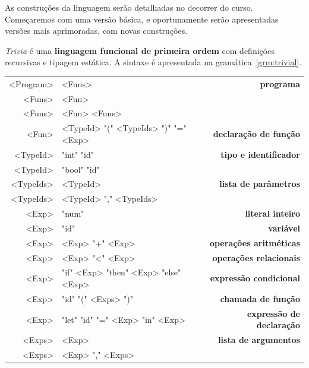 \documentclass[a4paper,11pt,brazil]{article}
\newcommand{\lang}{\textsl{Trivia}}
\begin{document}
As construções da linguagem serão detalhadas no decorrer do
curso. Começaremos com uma versão básica, e oportunamente serão
apresentadas versões mais aprimoradas, com novas construções.

\lang{} é uma \textbf{linguagem funcional de primeira ordem} com
definições recursivas e tipagem estática. A sintaxe é apresentada na
gramática~\ref{grm:trivial}.

\begin{gramatica}
  \begin{synshorts}
    \begin{mdframed}
    \begin{tabular}{r@{$\;\rightarrow\;$}l>{\bfseries}r}
      <Program> & <Funs>                               & programa                \\[.9em]
      <Funs>    & <Fun>                                &                         \\
      <Funs>    & <Fun> <Funs>                         &                         \\[.9em]
      <Fun>     & <TypeId> "(" <TypeIds> ")" "=" <Exp> & declaração de função    \\[.9em]
      <TypeId>  & "int" "id"                           & tipo e identificador    \\
      <TypeId>  & "bool" "id"                          &                         \\[.9em]
      <TypeIds> & <TypeId>                             & lista de parâmetros     \\
      <TypeIds> & <TypeId> "," <TypeIds>               &                         \\[.9em]
      <Exp>     & "num"                                & literal inteiro         \\
      <Exp>     & "id"                                 & variável                \\
      <Exp>     & <Exp> "+" <Exp>                      & operações aritméticas   \\
      <Exp>     & <Exp> "<" <Exp>                      & operações relacionais   \\
      <Exp>     & "if" <Exp> "then" <Exp> "else" <Exp> & expressão condicional   \\
      <Exp>     & "id" "(" <Exps> ")"                  & chamada de função       \\
      <Exp>     & "let" "id" "=" <Exp> "in" <Exp>      & expressão de declaração \\[.9em]
      <Exps>    & <Exp>                                & lista de argumentos     \\
      <Exps>    & <Exp> "," <Exps>                     &                         \\
    \end{tabular}
    \end{mdframed}
  \end{synshorts}
  \caption{Linguagem \lang{}}
  \label{grm:trivial}
\end{gramatica}
\end{document}
